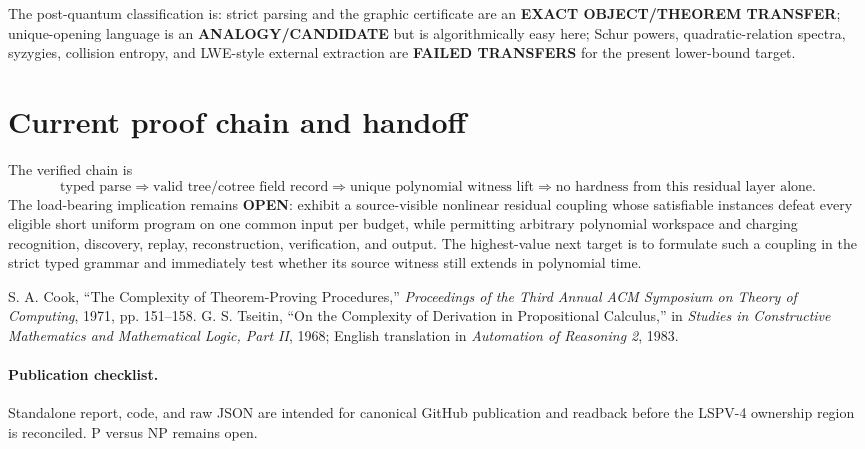 \documentclass[11pt]{article}
\newcommand{\OPEN}{\textbf{OPEN}}
\begin{document}
The post-quantum classification is: strict parsing and the graphic certificate
are an \textbf{EXACT OBJECT/THEOREM TRANSFER}; unique-opening language is an
\textbf{ANALOGY/CANDIDATE} but is algorithmically easy here; Schur powers,
quadratic-relation spectra, syzygies, collision entropy, and LWE-style external
extraction are \textbf{FAILED TRANSFERS} for the present lower-bound target.

\section{Current proof chain and handoff}
The verified chain is
\[
\text{typed parse}
\Longrightarrow
\text{valid tree/cotree field record}
\Longrightarrow
\text{unique polynomial witness lift}
\Longrightarrow
\text{no hardness from this residual layer alone}.
\]
The load-bearing implication remains \OPEN: exhibit a source-visible nonlinear
residual coupling whose satisfiable instances defeat every eligible short
uniform program on one common input per budget, while permitting arbitrary
polynomial workspace and charging recognition, discovery, replay,
reconstruction, verification, and output.  The highest-value next target is to
formulate such a coupling in the strict typed grammar and immediately test
whether its source witness still extends in polynomial time.

\begin{thebibliography}{9}
S. A. Cook, ``The Complexity of Theorem-Proving Procedures,''
\emph{Proceedings of the Third Annual ACM Symposium on Theory of Computing},
1971, pp. 151--158.
G. S. Tseitin, ``On the Complexity of Derivation in Propositional Calculus,''
in \emph{Studies in Constructive Mathematics and Mathematical Logic, Part II},
1968; English translation in \emph{Automation of Reasoning 2}, 1983.
\end{thebibliography}

\paragraph{Publication checklist.}
Standalone report, code, and raw JSON are intended for canonical GitHub
publication and readback before the LSPV-4 ownership region is reconciled.
P versus NP remains open.
\end{document}
